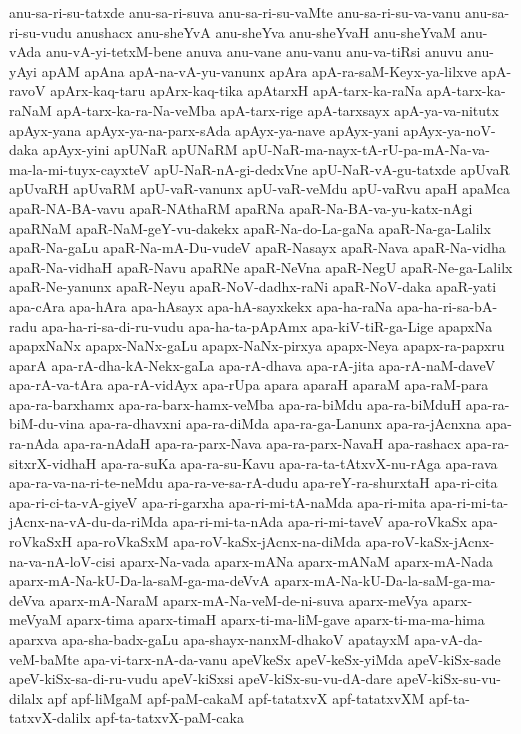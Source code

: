 {anu-sa-ri-su-tatxde
anu-sa-ri-suva
anu-sa-ri-su-vaMte
anu-sa-ri-su-va-vanu
anu-sa-ri-su-vudu
anushacx
anu-sheYvA
anu-sheYva
anu-sheYvaH
anu-sheYvaM
anu-vAda
anu-vA-yi-tetxM-bene
anuva
anu-vane
anu-vanu
anu-va-tiRsi
anuvu
anu-yAyi
apAM
apAna
apA-na-vA-yu-vanunx
apAra
apA-ra-saM-Keyx-ya-lilxve
apA-ravoV
apArx-kaq-taru
apArx-kaq-tika
apAtarxH
apA-tarx-ka-raNa
apA-tarx-ka-raNaM
apA-tarx-ka-ra-Na-veMba
apA-tarx-rige
apA-tarxsayx
apA-ya-va-nitutx
apAyx-yana
apAyx-ya-na-parx-sAda
apAyx-ya-nave
apAyx-yani
apAyx-ya-noV-daka
apAyx-yini
apUNaR
apUNaRM
apU-NaR-ma-nayx-tA-rU-pa-mA-Na-va-ma-la-mi-tuyx-cayxteV
apU-NaR-nA-gi-dedxVne
apU-NaR-vA-gu-tatxde
apUvaR
apUvaRH
apUvaRM
apU-vaR-vanunx
apU-vaR-veMdu
apU-vaRvu
apaH
apaMca
apaR-NA-BA-vavu
apaR-NAthaRM
apaRNa
apaR-Na-BA-va-yu-katx-nAgi
apaRNaM
apaR-NaM-geY-vu-dakekx
apaR-Na-do-La-gaNa
apaR-Na-ga-Lalilx
apaR-Na-gaLu
apaR-Na-mA-Du-vudeV
apaR-Nasayx
apaR-Nava
apaR-Na-vidha
apaR-Na-vidhaH
apaR-Navu
apaRNe
apaR-NeVna
apaR-NegU
apaR-Ne-ga-Lalilx
apaR-Ne-yanunx
apaR-Neyu
apaR-NoV-dadhx-raNi
apaR-NoV-daka
apaR-yati
apa-cAra
apa-hAra
apa-hAsayx
apa-hA-sayxkekx
apa-ha-raNa
apa-ha-ri-sa-bA-radu
apa-ha-ri-sa-di-ru-vudu
apa-ha-ta-pApAmx
apa-kiV-tiR-ga-Lige
apapxNa
apapxNaNx
apapx-NaNx-gaLu
apapx-NaNx-pirxya
apapx-Neya
apapx-ra-papxru
aparA
apa-rA-dha-kA-Nekx-gaLa
apa-rA-dhava
apa-rA-jita
apa-rA-naM-daveV
apa-rA-va-tAra
apa-rA-vidAyx
apa-rUpa
apara
aparaH
aparaM
apa-raM-para
apa-ra-barxhamx
apa-ra-barx-hamx-veMba
apa-ra-biMdu
apa-ra-biMduH
apa-ra-biM-du-vina
apa-ra-dhavxni
apa-ra-diMda
apa-ra-ga-Lanunx
apa-ra-jAcnxna
apa-ra-nAda
apa-ra-nAdaH
apa-ra-parx-Nava
apa-ra-parx-NavaH
apa-rashacx
apa-ra-sitxrX-vidhaH
apa-ra-suKa
apa-ra-su-Kavu
apa-ra-ta-tAtxvX-nu-rAga
apa-rava
apa-ra-va-na-ri-te-neMdu
apa-ra-ve-sa-rA-dudu
apa-reY-ra-shurxtaH
apa-ri-cita
apa-ri-ci-ta-vA-giyeV
apa-ri-garxha
apa-ri-mi-tA-naMda
apa-ri-mita
apa-ri-mi-ta-jAcnx-na-vA-du-da-riMda
apa-ri-mi-ta-nAda
apa-ri-mi-taveV
apa-roVkaSx
apa-roVkaSxH
apa-roVkaSxM
apa-roV-kaSx-jAcnx-na-diMda
apa-roV-kaSx-jAcnx-na-va-nA-loV-cisi
aparx-Na-vada
aparx-mANa
aparx-mANaM
aparx-mA-Nada
aparx-mA-Na-kU-Da-la-saM-ga-ma-deVvA
aparx-mA-Na-kU-Da-la-saM-ga-ma-deVva
aparx-mA-NaraM
aparx-mA-Na-veM-de-ni-suva
aparx-meVya
aparx-meVyaM
aparx-tima
aparx-timaH
aparx-ti-ma-liM-gave
aparx-ti-ma-ma-hima
aparxva
apa-sha-badx-gaLu
apa-shayx-nanxM-dhakoV
apatayxM
apa-vA-da-veM-baMte
apa-vi-tarx-nA-da-vanu
apeVkeSx
apeV-keSx-yiMda
apeV-kiSx-sade
apeV-kiSx-sa-di-ru-vudu
apeV-kiSxsi
apeV-kiSx-su-vu-dA-dare
apeV-kiSx-su-vu-dilalx
apf
apf-liMgaM
apf-paM-cakaM
apf-tatatxvX
apf-tatatxvXM
apf-ta-tatxvX-dalilx
apf-ta-tatxvX-paM-caka
}
